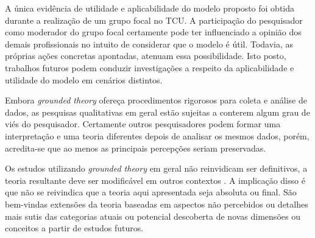 A única evidência de utilidade e aplicabilidade do modelo proposto foi
obtida durante a realização de um grupo focal no \acrshort{TCU}. A participação
do pesquisador como moderador do grupo focal certamente pode ter influenciado
a opinião dos demais profissionais no intuito de considerar que o modelo é útil.
Todavia, as próprias ações concretas apontadas, atenuam essa possibilidade. Isto
posto, trabalhos futuros podem conduzir investigações a respeito da
aplicabilidade e utilidade do modelo em cenários distintos.

Embora {\it grounded theory} ofereça procedimentos rigorosos para coleta e
análise de dados, as pesquisas qualitativas em geral estão sujeitas a conterem
algum grau de viés do pesquisador. Certamente outros pesquisadores podem formar
uma interpretação e uma teoria diferentes depois de analisar os mesmos dados,
porém, acredita-se que ao menos as principais percepções seriam preservadas.

Os estudos utilizando {\it grounded theory} em geral não reinvidicam ser
definitivos, a teoria resultante deve ser modificável em outros contextos \cite{hoda2012developing}.
A implicação disso é que não se reivindica que a teoria aqui apresentada seja
absoluta ou final. São bem-vindas extensões da teoria baseadas em aspectos não
percebidos ou detalhes mais sutis das categorias atuais ou potencial descoberta
de novas dimensões ou conceitos a partir de estudos futuros.
